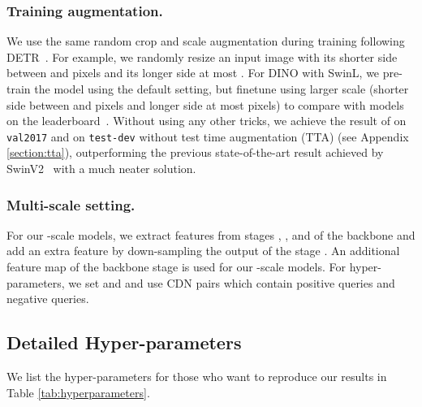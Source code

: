 \documentclass[runningheads]{llncs}
\begin{document}
\subsubsection{Training augmentation.}
We use the same random crop and scale augmentation during training following DETR~\cite{carion2020end}. For example, we randomly resize an input image with its shorter side between  and  pixels and its longer side at most . For DINO with SwinL, we pre-train the model using the default setting, but finetune using  larger scale (shorter side between  and  pixels and longer side at most  pixels) to compare with models on the leaderboard~\cite{paperwithcode}. Without using any other tricks, we achieve the result of  on \texttt{val2017} and  on \texttt{test-dev} without test time augmentation (TTA) (see Appendix \ref{section:tta}), outperforming  the previous state-of-the-art result  achieved by SwinV2~\cite{liu2021swinv2} with a much neater solution. 

\subsubsection{Multi-scale setting.}
For our -scale models, we extract features from stages , , and  of the backbone and add an extra feature by down-sampling the output of the stage . An additional feature map of the backbone stage  is used for our -scale models.
For hyper-parameters, we set  and  and use  CDN pairs which contain  positive queries and  negative queries.
\subsection{Detailed Hyper-parameters}
We list the hyper-parameters for those who want to reproduce our results in Table \ref{tab:hyperparameters}.
\end{document}
